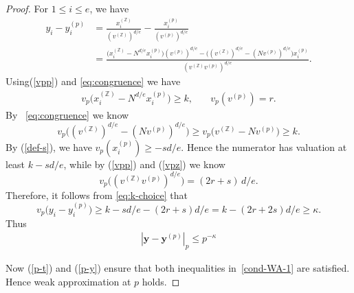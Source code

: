 \documentclass[10pt,a4paper]{amsart}
\newcommand{\ZZ}{\mathbb{Z}}
\newcommand{\yy}{\mathbf{y}}
\renewcommand{\geq}{\geqslant}
\renewcommand{\ge}{\geqslant}
\renewcommand{\le}{\leqslant}
\begin{document}
\begin{proof}
For $1\le i\le e$, we have
\begin{align*}
y_i-y_i^{(p)}
&=\frac{x_i^{(\ZZ)}}{(v^{(\ZZ)})^{d/e}}-\frac{x_i^{(p)}}{(v^{(p)})^{d/e}}\\[2pt]
&=\frac{\bigl(x_i^{(\ZZ)}-N^{d/e}x_i^{(p)}\bigr)(v^{(p)})^{d/e}
         -\bigl((v^{(\ZZ)})^{d/e}-(Nv^{(p)})^{d/e}\bigr)x_i^{(p)}}
       {(v^{(\ZZ)}v^{(p)})^{d/e}}.
\end{align*}
Using(\ref{vpp}) and \eqref{eq:congruence} we have  
\begin{align*}
v_p \bigl(x_i^{(\ZZ)}-N^{d/e}x_i^{(p)}\bigr)\ge k,& \quad
v_p(v^{(p)}) = r.
\end{align*}
By ~\eqref{eq:congruence} we know
$$
v_p \bigl((v^{(\ZZ)})^{d/e}-(Nv^{(p)})^{d/e}\bigr) \geq v_p \bigl(v^{(\ZZ)}-Nv^{(p)}\bigr) \geq   k.$$ 
By (\ref{def-s}), we have $v_p(x_i^{(p)}) \geq -sd/e.$
Hence the numerator has valuation at least $k-sd/e$, while by (\ref{vpp}) and (\ref{vpz}) we know 
\[
v_p\bigl((v^{(\ZZ)}v^{(p)})^{d/e}\bigr)=(2r+s)\,d/e.
\]
Therefore, it follows from \eqref{eq:k-choice} that
\[
v_p\bigl(y_i-y_i^{(p)}\bigr) \geq k - sd/e - (2r+s)d/e = k-(2r+2s)d/e\ge\kappa.
\]
Thus 
\begin{align}\label{p-y}
	|\yy-\yy^{(p)}|_p\le p^{-\kappa}
\end{align}

\medskip
Now (\ref{p-t}) and (\ref{p-y}) ensure that both inequalities in~\eqref{cond-WA-1} are satisfied. Hence weak approximation at $p$ holds.
\end{proof}
\end{document}
